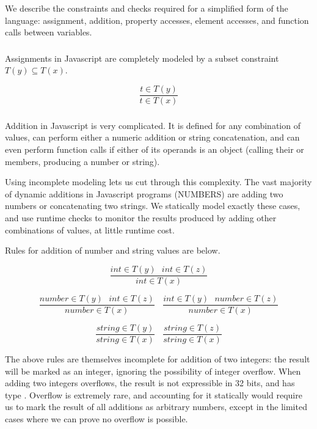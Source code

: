 We describe the constraints and checks required for a simplified form
of the language: assignment, addition, property accesses, element accesses,
and function calls between variables.

\subsubsection{}

Assignments in Javascript are completely modeled by a subset constraint
$T(y) \subseteq T(x)$.

\begin{equation*}
\frac{t \in T(y)}{t \in T(x)}
\end{equation*}

\subsubsection{}

Addition in Javascript is very complicated. It is defined for any
combination of values, can perform either a numeric addition or
string concatenation, and can even perform function calls if either of
its operands is an object (calling their  or
 members, producing a number or string).

Using incomplete modeling lets us cut through this complexity.
The vast majority of dynamic additions in Javascript programs (NUMBERS)
are adding two numbers or concatenating two strings.
We statically model exactly these cases, and use runtime checks to monitor
the results produced by adding other combinations of values,
at little runtime cost.

Rules for addition of number and string values are below.

\begin{equation*}
\frac{int \in T(y) ~~~ int \in T(z)}{int \in T(x)}
\end{equation*}

\begin{equation*}
\frac{number \in T(y) ~~~ int \in T(z)}{number \in T(x)}
~~~~
\frac{int \in T(y) ~~~ number \in T(z)}{number \in T(x)}
\end{equation*}

\begin{equation*}
\frac{string \in T(y)}{string \in T(x)}
~~~~
\frac{string \in T(z)}{string \in T(x)}
\end{equation*}

The above rules are themselves incomplete for addition of two integers:
the result will be marked as an integer, ignoring the possibility of
integer overflow.
When adding two integers overflows, the result is not expressible in
32 bits, and has type .
Overflow is extremely rare, and accounting for it statically would require
us to mark the result of all additions as arbitrary numbers,
except in the limited cases where we can prove no overflow is possible.

